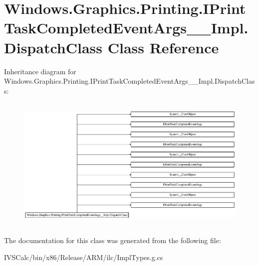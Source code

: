 \hypertarget{class_windows_1_1_graphics_1_1_printing_1_1_i_print_task_completed_event_args_____impl_1_1_dispatch_class}{}\section{Windows.\+Graphics.\+Printing.\+I\+Print\+Task\+Completed\+Event\+Args\+\_\+\+\_\+\+Impl.\+Dispatch\+Class Class Reference}
\label{class_windows_1_1_graphics_1_1_printing_1_1_i_print_task_completed_event_args_____impl_1_1_dispatch_class}
Inheritance diagram for Windows.\+Graphics.\+Printing.\+I\+Print\+Task\+Completed\+Event\+Args\+\_\+\+\_\+\+Impl.\+Dispatch\+Class\+:\begin{figure}[H]
\begin{center}
\leavevmode
\includegraphics[height=6.567164cm]{class_windows_1_1_graphics_1_1_printing_1_1_i_print_task_completed_event_args_____impl_1_1_dispatch_class}
\end{center}
\end{figure}


The documentation for this class was generated from the following file\+:\begin{DoxyCompactItemize}
\item 
I\+V\+S\+Calc/bin/x86/\+Release/\+A\+R\+M/ilc/Impl\+Types.\+g.\+cs\end{DoxyCompactItemize}
